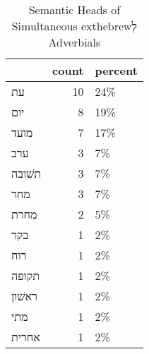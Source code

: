 \begin{table}[htbp!]
\centering
\caption{Semantic Heads of Simultaneous 	exthebrew{לְ} Adverbials}
\label{table:siml_head_cp}
\begin{tabular}{lrl}
\toprule
{} &  count & percent \\
\midrule
עת     &     10 &     24\% \\
יום    &      8 &     19\% \\
מועד   &      7 &     17\% \\
ערב    &      3 &      7\% \\
תשׁובה &      3 &      7\% \\
מחר    &      3 &      7\% \\
מחרת   &      2 &      5\% \\
בקר    &      1 &      2\% \\
רוח    &      1 &      2\% \\
תקופה  &      1 &      2\% \\
ראשׁון &      1 &      2\% \\
מתי    &      1 &      2\% \\
אחרית  &      1 &      2\% \\
\bottomrule
\end{tabular}
\end{table}
